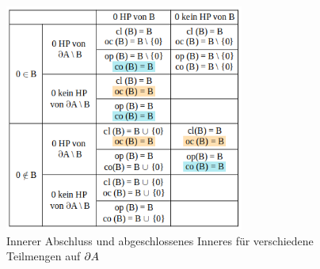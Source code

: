     \begin{figure}[ht]
        \centering
        \includegraphics[width=0.7\textwidth]{abb/tab-standardbsp.png}
        \caption{Innerer Abschluss und abgeschlossenes Inneres für verschiedene Teilmengen auf $\partial A$}
        \label{fig:tab-standardbsp}
    \end{figure}
    
    
